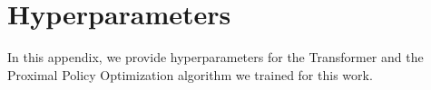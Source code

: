 
\section{Hyperparameters}

In this appendix, we provide hyperparameters for the Transformer and the Proximal Policy Optimization algorithm we trained for this work. 